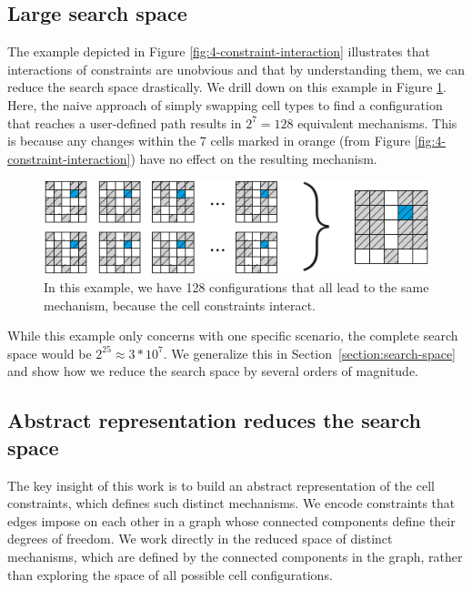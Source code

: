 \subsection{Large search space}
The example depicted in Figure \ref{fig:4-constraint-interaction} illustrates that interactions of constraints are unobvious and that by understanding them, we can reduce the search space drastically. We drill down on this example in Figure \ref{fig:5-large-search-space}. Here, the naive approach of simply swapping cell types to find a configuration that reaches a user-defined path results in $2^7=128$ equivalent mechanisms. This is because any changes within the 7 cells marked in orange (from Figure \ref{fig:4-constraint-interaction}) have no effect on the resulting mechanism. 

\begin{figure} [h]
    \includegraphics[width=\textwidth]{chapters/understanding-metamaterial-mechanisms-FIG/5-large-search-space.pdf}
    \caption[Short figure name.]{In this example, we have 128 configurations that all lead to the same mechanism, because the cell constraints interact. 
    \label{fig:5-large-search-space}}
\end{figure}

While this example only concerns with one specific scenario, the complete search space would be $2^{25} \approx 3*{10}^7$. We generalize this in Section~\ref{section:search-space} and show how we reduce the search space by several orders of magnitude.


\subsection{Abstract representation reduces the search space}

The key insight of this work is to build an abstract representation of the cell constraints, which defines such distinct mechanisms. We encode constraints that edges impose on each other in a graph whose connected components define their degrees of freedom. We work directly in the reduced space of distinct mechanisms, which are defined by the connected components in the graph, rather than exploring the space of all possible cell configurations. 


